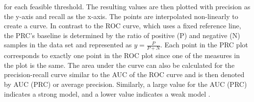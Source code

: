 for each feasible threshold. The 
resulting values are then plotted with precision as the y-axis and 
recall as the x-axis. The points are interpolated non-linearly to 
create a curve. 
In contrast to the ROC curve, which uses a fixed reference line, the PRC's 
baseline is determined by the ratio of positive (P) and negative (N) samples in 
the data set and represented as $y = \frac{P}{P + N}$. Each point in the PRC 
plot corresponds to exactly one point in the ROC plot since one of the measures 
in the plot is the same. The area under the curve can also be 
calculated for the precision-recall curve similar to the AUC of the ROC curve 
and is then denoted by AUC (PRC) or average precision. Similarly, a large value 
for the AUC (PRC) indicates a strong model, and a lower value indicates a weak 
model \cite{RN160, RN161}.
